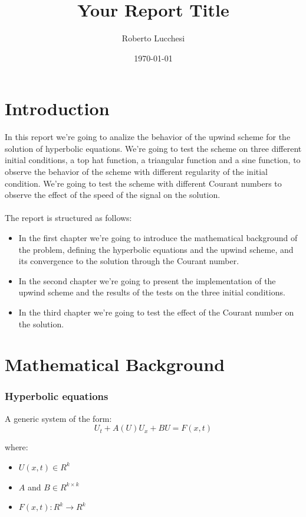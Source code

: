 \documentclass{report}
\title{Your Report Title}
\author{Roberto Lucchesi}
\date{\today}
\begin{document}
\maketitle

\chapter*{Introduction}
In this report we're going to analize the behavior of the upwind scheme for the solution
of hyperbolic equations. We're going to test the scheme on three different initial
conditions, a top hat function, a triangular function and a sine function, to observe
the behavior of the scheme with different regularity of the initial condition.
We're going to test the scheme with different Courant numbers to observe the effect of
the speed of the signal on the solution.\\\\

The report is structured as follows:
\begin{itemize}
    \item In the first chapter we're going to introduce the mathematical background of the problem,
          defining the hyperbolic equations and the upwind scheme, and its convergence to the solution through the Courant number.
    \item In the second chapter we're going to present the implementation of the upwind scheme
          and the results of the tests on the three initial conditions.
    \item In the third chapter we're going to test the effect of the Courant number on the solution.
\end{itemize}
\chapter*{Mathematical Background}
\subsection*{Hyperbolic equations}

A generic system of the form:
\begin{equation*}
    U_t + A(U)U_x + BU = F(x,t)
\end{equation*}

where:

\begin{itemize}
    \item $U(x,t) \in R^k$
    \item $A$ and $B \in R^{k\times k}$
    \item $F(x,t): R^{k} \rightarrow R^k$
\end{itemize}
\end{document}
